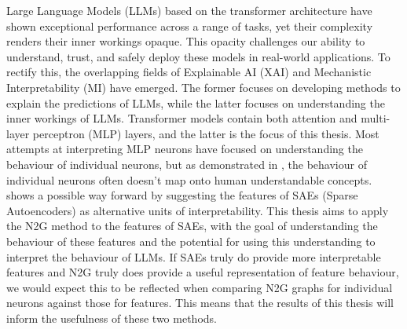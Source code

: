 \documentclass[../main.tex]{subfiles}
\begin{document}
Large Language Models (LLMs) based on the transformer architecture \citep{vaswani_attention_2023} have shown exceptional performance across a range of tasks, yet their complexity renders their inner workings opaque.
This opacity challenges our ability to understand, trust, and safely deploy these models in real-world applications.
To rectify this, the overlapping fields of Explainable AI (XAI) and Mechanistic Interpretability (MI) have emerged.
The former focuses on developing methods to explain the predictions of LLMs, while the latter focuses on understanding the inner workings of LLMs.
Transformer models contain both attention and multi-layer perceptron (MLP) layers, and the latter is the focus of this thesis.
Most attempts at interpreting MLP neurons have focused on understanding the behaviour of individual neurons, but as demonstrated in \citet{elhage_toy_2022}, the behaviour of individual neurons often doesn't map onto human understandable concepts.
\citet{bricken_towards_2023} shows a possible way forward by suggesting the features of SAEs (Sparse Autoencoders) as alternative units of interpretability.
This thesis aims to apply the N2G \citep{foote_neuron_2023} method to the features of SAEs, with the goal of understanding the behaviour of these features and the potential for using this understanding to interpret the behaviour of LLMs.
If SAEs truly do provide more interpretable features and N2G truly does provide a useful representation of feature behaviour, we would expect this to be reflected when comparing N2G graphs for individual neurons against those for features. 
This means that the results of this thesis will inform the usefulness of these two methods.

\subbib
\end{document}
